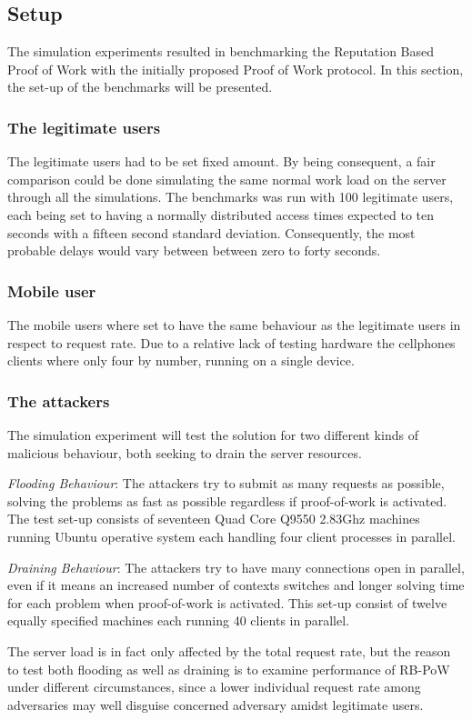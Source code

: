 

\subsection{Setup}
The simulation experiments resulted in benchmarking the Reputation Based Proof of Work with the initially proposed Proof of Work protocol. In this section, the set-up of the benchmarks will be presented.
\label{text:setup}
\subsubsection{The legitimate users} 
The legitimate users had to be set fixed amount. By being consequent, a fair comparison could be done simulating the same normal work load on the server through all the simulations. The benchmarks was run with 100 legitimate users, each being set to having a normally distributed access times expected to ten seconds with a fifteen second standard deviation. Consequently, the most probable delays would vary between between zero to forty seconds.
\\
\subsubsection{Mobile user}
The mobile users where set to have the same behaviour as the legitimate users in respect to request rate. Due to a relative lack of testing hardware the cellphones clients where only four by number, running on a single device. 
\\
\subsubsection{The attackers} 
The simulation experiment will test the solution for two different kinds of malicious behaviour, both seeking to drain the server resources.

\emph{Flooding Behaviour}: The attackers try to submit as many requests as possible, solving the problems as fast as possible regardless if proof-of-work is activated. The test set-up consists of seventeen Quad Core Q9550 2.83Ghz machines running Ubuntu operative system each handling four client processes in parallel.

\emph{Draining Behaviour}: The attackers try to have many connections open in parallel, even if it means an increased number of contexts switches and longer solving time for each problem when proof-of-work is activated. This set-up consist of twelve equally specified machines each running 40 clients in parallel.

The server load is in fact only affected by the total request rate, but the reason to test both flooding as well as draining is to examine performance of RB-PoW under different circumstances, since a lower individual request rate among adversaries may well disguise concerned adversary amidst legitimate users.


